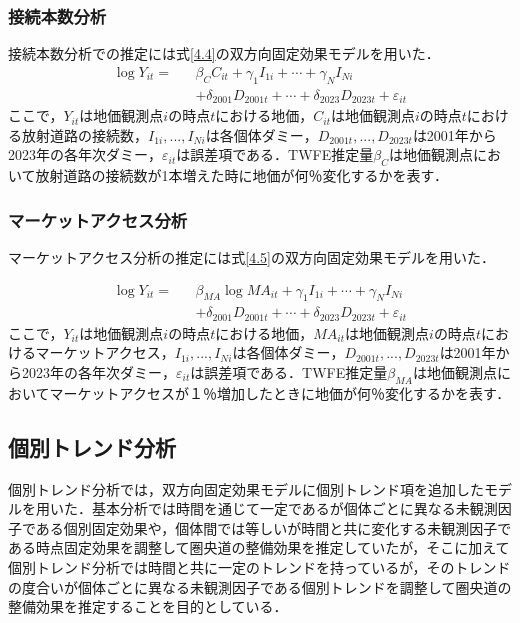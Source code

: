 \subsubsection{接続本数分析}
接続本数分析での推定には式\ref{4.4}の双方向固定効果モデルを用いた．
\begin{eqnarray}
    \log{Y_{it}}= &&\beta_{C}C_{it} + \gamma_{1}I_{1i} + \cdots + \gamma_{N}I_{Ni} \nonumber \\
    && + \delta_{2001}D_{2001t} + \cdots + \delta_{2023}D_{2023t} + \varepsilon_{it}
  \label{4.4}
\end{eqnarray}
ここで，$Y_{it}$は地価観測点$i$の時点$t$における地価，$C_{it}$は地価観測点$i$の時点$t$における放射道路の接続数，$I_{1i},...,I_{Ni}$は各個体ダミー，$D_{2001t},...,D_{2023t}$は2001年から2023年の各年次ダミー，$\varepsilon_{it}$は誤差項である．TWFE推定量$\beta_{C}$は地価観測点において放射道路の接続数が1本増えた時に地価が何％変化するかを表す．

\subsubsection{マーケットアクセス分析}
マーケットアクセス分析の推定には式\ref{4.5}の双方向固定効果モデルを用いた．

\begin{eqnarray}
  \log{Y_{it}}= &&\beta_{MA}\log{{MA}_{it}}+ \gamma_{1}I_{1i} + \cdots + \gamma_{N}I_{Ni}  \nonumber \\
    && + \delta_{2001}D_{2001t} + \cdots + \delta_{2023}D_{2023t} + \varepsilon_{it}
    \label{4.5}
\end{eqnarray}  
ここで，$Y_{it}$は地価観測点$i$の時点$t$における地価，$MA_{it}$は地価観測点$i$の時点$t$におけるマーケットアクセス，$I_{1i},...,I_{Ni}$は各個体ダミー，$D_{2001t},...,D_{2023t}$は2001年から2023年の各年次ダミー，$\varepsilon_{it}$は誤差項である．TWFE推定量$\beta_{MA}$は地価観測点においてマーケットアクセスが１％増加したときに地価が何％変化するかを表す．
\subsection{個別トレンド分析}
個別トレンド分析では，双方向固定効果モデルに個別トレンド項を追加したモデルを用いた．基本分析では時間を通じて一定であるが個体ごとに異なる未観測因子である個別固定効果や，個体間では等しいが時間と共に変化する未観測因子である時点固定効果を調整して圏央道の整備効果を推定していたが，そこに加えて個別トレンド分析では時間と共に一定のトレンドを持っているが，そのトレンドの度合いが個体ごとに異なる未観測因子である個別トレンドを調整して圏央道の整備効果を推定することを目的としている．

